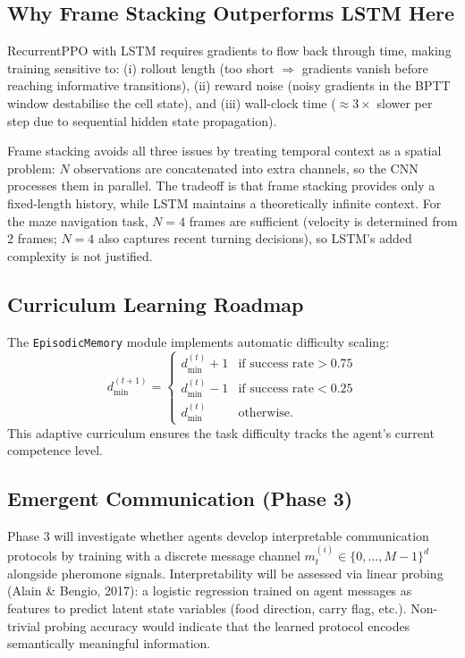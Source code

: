 \documentclass[11pt,a4paper]{article}
\begin{document}
\subsection{Why Frame Stacking Outperforms LSTM Here}

RecurrentPPO with LSTM requires gradients to flow back through time,
making training sensitive to:
(i) rollout length (too short $\Rightarrow$ gradients vanish before reaching
    informative transitions),
(ii) reward noise (noisy gradients in the BPTT window destabilise
    the cell state), and
(iii) wall-clock time ($\approx 3\times$ slower per step due to sequential
    hidden state propagation).

Frame stacking avoids all three issues by treating temporal context
as a spatial problem: $N$ observations are concatenated into extra channels,
so the CNN processes them in parallel.
The tradeoff is that frame stacking provides only a fixed-length history,
while LSTM maintains a theoretically infinite context.
For the maze navigation task, $N=4$ frames are sufficient
(velocity is determined from 2 frames; $N=4$ also captures
recent turning decisions), so LSTM's added complexity is not justified.

\subsection{Curriculum Learning Roadmap}

The \texttt{EpisodicMemory} module implements automatic difficulty scaling:
\begin{equation}
  d_{\min}^{(t+1)} =
  \begin{cases}
    d_{\min}^{(t)} + 1 & \text{if success rate} > 0.75 \\
    d_{\min}^{(t)} - 1 & \text{if success rate} < 0.25 \\
    d_{\min}^{(t)}     & \text{otherwise.}
  \end{cases}
\end{equation}
This adaptive curriculum ensures the task difficulty tracks the agent's
current competence level.

\subsection{Emergent Communication (Phase 3)}

Phase 3 will investigate whether agents develop interpretable
communication protocols by training with a discrete message channel
$m_t^{(i)} \in \{0,\ldots,M-1\}^d$ alongside pheromone signals.
Interpretability will be assessed via linear probing
(Alain \& Bengio, 2017): a logistic regression trained on agent messages
as features to predict latent state variables (food direction, carry flag, etc.).
Non-trivial probing accuracy would indicate that the learned protocol
encodes semantically meaningful information.
\end{document}
